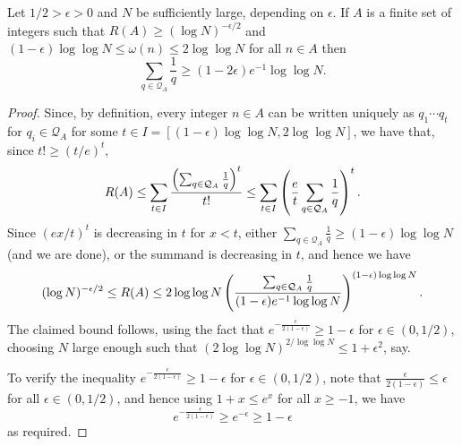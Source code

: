 \begin{lemma}\label{lem:rtop}
Let $1/2>\epsilon>0$ and $N$ be sufficiently large, depending on $\epsilon$. If $A$ is a finite set of integers such that $R(A)\geq (\log N)^{-\epsilon/2}$ and $(1-\epsilon)\log\log N\leq \omega(n)\leq  2\log\log N$ for all $n\in A$ then
\[\sum_{q\in\mathcal{Q}_A}\frac{1}{q} \geq (1-2\epsilon)e^{-1}\log\log N.\]
\leanok
{}
\end{lemma}
\begin{proof}
  \leanok
Since, by definition, every integer $n\in A$ can be written uniquely as $q_1\cdots q_t$ for $q_i\in \mathcal{Q}_A$ for some $t\in I = [(1-\epsilon)\log\log N, 2\log\log N]$, we have that, since $t!\geq (t/e)^t$,
\[R(A)\leq  \sum_{t\in I}\frac{\left( \sum_{q\in \mathcal{Q}_A}\frac{1}{q}\right)^t}{t!}\leq \sum_{t\in I}\left( \frac{e}{t}\sum_{q\in \mathcal{Q}_A}\frac{1}{q}\right)^t.\]
Since $(ex/t)^t$ is decreasing in $t$ for $x<t$, either $\sum_{q\in \mathcal{Q}_A}\frac{1}{q}\geq (1-\epsilon)\log\log N$ (and we are done), or the summand is decreasing in $t$, and hence we have
\[(\log N)^{-\epsilon/2}\leq R(A)\leq 2\log\log N\left( \frac{\sum_{q\in \mathcal{Q}_A}\frac{1}{q}}{(1-\epsilon)e^{-1}\log\log N}\right)^{(1-\epsilon)\log\log N}.\]
The claimed bound follows, using the fact that $e^{-\frac{\epsilon}{2(1-\epsilon)}}\geq 1-\epsilon$ for $\epsilon\in (0,1/2)$, choosing $N$ large enough such that $(2\log\log N)^{2/\log\log N}\leq 1+\epsilon^2$, say.

To verify the inequality $e^{-\frac{\epsilon}{2(1-\epsilon)}}\geq 1-\epsilon$ for $\epsilon\in (0,1/2)$, note that $\frac{\epsilon}{2(1-\epsilon)}\leq \epsilon$ for all $\epsilon\in (0,1/2)$, and hence using $1+x\leq e^{x}$ for all $x\geq -1$, we have
\[e^{-\frac{\epsilon}{2(1-\epsilon)}}\geq e^{-\epsilon}\geq 1-\epsilon\]
as required.
\end{proof}

